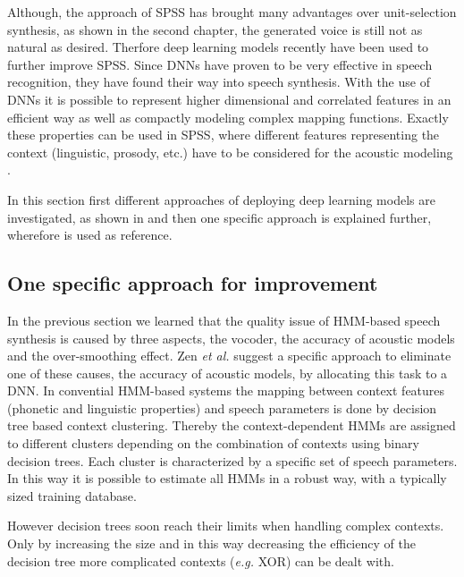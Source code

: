 {\color{ACMRed}Although, the approach of \ac{SPSS} has brought many advantages over unit-selection synthesis, as shown in the second chapter, the generated voice is still not as natural as desired. Therfore deep learning models recently have been used to further improve \ac{SPSS}. Since \acp{DNN} have proven to be very effective in speech recognition, they have found their way into speech synthesis. With the use of \acp{DNN} it is possible to represent higher dimensional and correlated features in an efficient way as well as compactly modeling complex mapping functions. Exactly these properties can be used in \ac{SPSS}, where different features representing the context (linguistic, prosody, etc.) have to be considered for the acoustic modeling \cite{hashimoto:effect}.}

{\color{ACMRed}In this section first different approaches of deploying deep learning models are investigated, as shown in \cite{hashimoto:effect} and then one specific approach is explained further, wherefore \cite{zen:deepstatistical} is used as reference.}

\subsection{One specific approach for improvement}
\label{subsec:deepspss}

In the previous section we learned that the quality issue of \ac{HMM}-based speech synthesis is caused by three aspects, the vocoder, the accuracy of acoustic models and the over-smoothing effect. Zen \textit{et al.} \cite{zen:deepstatistical} suggest a specific approach to eliminate one of these causes, the accuracy of acoustic models, by allocating this task to a \ac{DNN}. In convential \ac{HMM}-based systems the mapping between context features (phonetic and linguistic properties) and speech parameters is done by decision tree based context clustering. Thereby the context-dependent \acp{HMM} are assigned to different clusters depending on the combination of contexts using binary decision trees. Each cluster is characterized by a specific set of speech parameters. In this way it is possible to estimate all \acp{HMM} in a robust way, with a typically sized training database.

However decision trees soon reach their limits when handling complex contexts. Only by increasing the size and in this way decreasing the efficiency of the decision tree more complicated contexts (\textit{e.g.} XOR) can be dealt with. 

